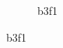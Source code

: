 \begin{figure}[!t]
\begin{subfigure}[t]{0.32\linewidth}
 	\caption{b3f1}
 	\label{fig:b3f1}
\end{subfigure}
 \end{figure}








